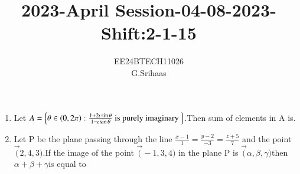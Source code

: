 \documentclass[journal]{IEEEtran}
\numberwithin{equation}{enumi}
\numberwithin{figure}{enumi}
\begin{document}


\title{2023-April Session-04-08-2023-Shift:2-1-15}
\author{EE24BTECH11026 \\ G.Srihaas}

{\let\newpage\relax\maketitle}

\begin{enumerate}
	\item 
        Let $A= \left\{\theta \in \left(0,2\pi\right):\frac{1+2\iota\sin{\theta}}{1-\iota\sin{\theta}} \text{ is purely imaginary }\right\}$.Then sum of elements in A is. 
        \hfill{}
               \begin{enumerate}
            \end{enumerate}
            
	\item Let P be the plane passing through the line $\frac{x-1}{1}= \frac{y-2}{-3}= \frac{z+5}{7}$ and the point $\vec (2,4,3)$.If the image of the point $\vec(-1,3,4)$ in the plane P is $\vec(\alpha,\beta,\gamma)$then $\alpha+\beta+\gamma$is equal to
        \hfill{}
                \begin{enumerate}
            \end{enumerate} 
            

\end{enumerate}
\end{document}
